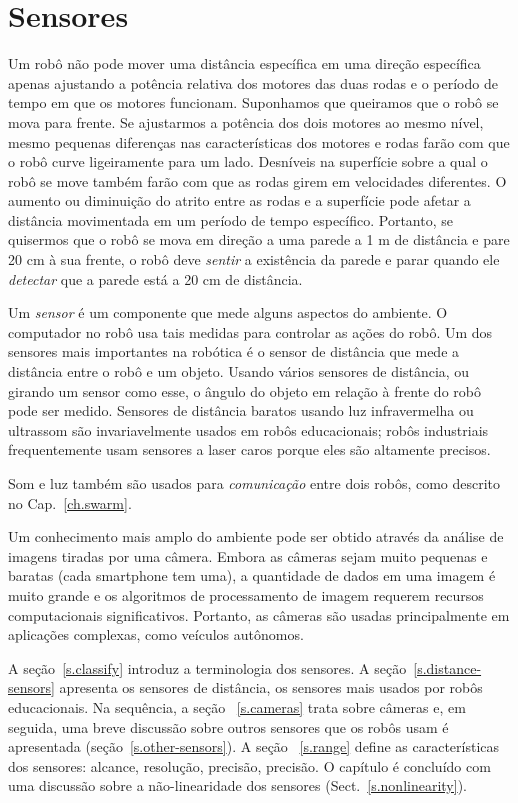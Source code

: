 
\chapter{Sensores}\label{ch.sensors}

Um robô não pode mover uma distância específica em uma direção específica apenas ajustando a potência relativa dos motores das duas rodas e o período de tempo em que os motores funcionam. Suponhamos que queiramos que o robô se mova para frente. Se ajustarmos a potência dos dois motores ao mesmo nível, mesmo pequenas diferenças nas características dos motores e rodas farão com que o robô curve ligeiramente para um lado. Desníveis na superfície sobre a qual o robô se move também farão com que as rodas girem em velocidades diferentes. O aumento ou diminuição do atrito entre as rodas e a superfície pode afetar a distância movimentada em um período de tempo específico. Portanto, se quisermos que o robô se mova em direção a uma parede a 1 m de distância e pare 20 cm à sua frente, o robô deve \emph{sentir} a existência da parede e parar quando ele \emph{detectar} que a parede está a 20 cm de distância.

Um \emph{sensor} é um componente que mede alguns aspectos do ambiente. O computador no robô usa tais medidas para controlar as ações do robô. Um dos sensores mais importantes na robótica é o sensor de distância que mede a distância entre o robô e um objeto. Usando vários sensores de distância, ou girando um sensor como esse, o ângulo do objeto em relação à frente do robô pode ser medido. Sensores de distância baratos usando luz infravermelha ou ultrassom são invariavelmente usados em robôs educacionais; robôs industriais frequentemente usam sensores a laser caros porque eles são altamente precisos.

Som e luz também são usados para \emph{comunicação} entre dois robôs, como descrito no Cap.~\ref{ch.swarm}.

Um conhecimento mais amplo do ambiente pode ser obtido através da análise de imagens tiradas por uma câmera. Embora as câmeras sejam muito pequenas e baratas (cada smartphone tem uma), a quantidade de dados em uma imagem é muito grande e os algoritmos de processamento de imagem requerem recursos computacionais significativos. Portanto, as câmeras são usadas principalmente em aplicações complexas, como veículos autônomos.

A seção~\ref{s.classify} introduz a terminologia dos sensores. A seção~\ref{s.distance-sensors} apresenta os sensores de distância, os sensores mais usados por robôs educacionais. Na sequência, a seção ~\ref{s.cameras} trata sobre câmeras e, em seguida, uma breve discussão sobre outros sensores que os robôs usam é apresentada (seção~\ref{s.other-sensors}). A seção ~\ref{s.range} define as características dos sensores: alcance, resolução, precisão, precisão. O capítulo é concluído com uma discussão sobre a não-linearidade dos sensores (Sect.~\ref{s.nonlinearity}).


